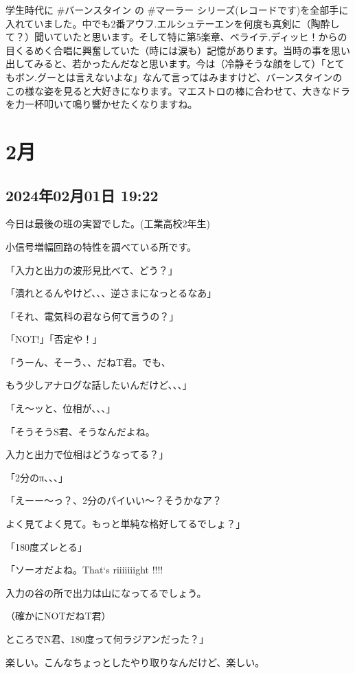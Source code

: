 \documentclass[facebook_diary.tex]{subfiles}
\begin{document}
学生時代に \#バーンスタイン の \#マーラー シリーズ(レコードです)を全部手に入れていました。中でも2番アウフ.エルシュテーエンを何度も真剣に（陶酔して？）聞いていたと思います。そして特に第5楽章、ベライテ.ディッヒ！からの目くるめく合唱に興奮していた（時には涙も）記憶があります。当時の事を思い出してみると、若かったんだなと思います。今は（冷静そうな顔をして）「とてもボン.グーとは言えないよな」なんて言ってはみますけど、バーンスタインのこの様な姿を見ると大好きになります。マエストロの棒に合わせて、大きなドラを力一杯叩いて鳴り響かせたくなりますね。

\section{2月}

\subsection*{2024年02月01日 19:22}

今日は最後の班の実習でした。(工業高校2年生)

小信号増幅回路の特性を調べている所です。


「入力と出力の波形見比べて、どう？」

「潰れとるんやけど、、、逆さまになっとるなあ」

「それ、電気科の君なら何て言うの？」

「NOT!」「否定や！」

「うーん、そーう、、だねT君。でも、

もう少しアナログな話したいんだけど、、、」

「え〜ッと、位相が、、、」

「そうそうS君、そうなんだよね。

入力と出力で位相はどうなってる？」

「2分のπ、、、」

「えーー〜っ？、2分のパイいい〜？そうかなア？

よく見てよく見て。もっと単純な格好してるでしょ？」

「180度ズレとる」

「ソーオだよね。That‘s riiiiiiight !!!!

入力の谷の所で出力は山になってるでしょう。

（確かにNOTだねT君）

ところでN君、180度って何ラジアンだった？」


楽しい。こんなちょっとしたやり取りなんだけど、楽しい。
\end{document}
